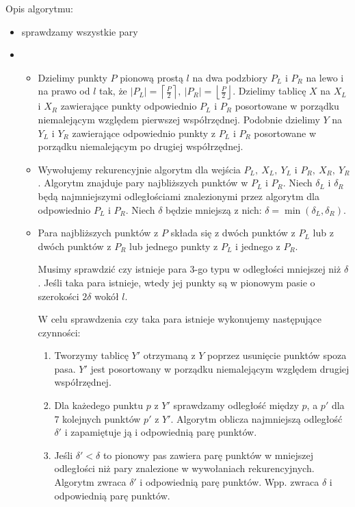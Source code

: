 Opis algorytmu: 
\begin{itemize}
	\item[jeśli $|P| \leq 3$] sprawdzamy wszystkie pary
	\item[jeśli $|P| > 3$] ~ 
	\begin{itemize}
		\item[\underline{Dziel:}] Dzielimy punkty $P$ pionową prostą $l$ na dwa podzbiory $P_L$ i $P_R$ na lewo i na prawo 
		od $l$ tak, że $|P_L| = \left\lceil \frac{P}{2} \right\rceil,\ |P_R| = \left\lfloor \frac{P}{2} \right\rfloor$. 
		Dzielimy tablicę $X$ na $X_L$ i $X_R$ zawierające punkty odpowiednio $P_L$ i $P_R$ posortowane w porządku 
		niemalejącym względem pierwszej współrzędnej. Podobnie dzielimy $Y$ na $Y_L$ i $Y_R$ zawierające 
		odpowiednio punkty z $P_L$ i $P_R$ posortowane w porządku niemalejącym po drugiej współrzędnej. 
		
		\item[\underline{Zwyciężaj:}] Wywołujemy rekurencyjnie algorytm dla wejścia $P_L,\ X_L,\ Y_L$ i $P_R,\ X_R,\ Y_R$. 
		Algorytm znajduje pary najbliższych punktów w $P_L$ i $P_R$. Niech $\delta_L$ i $\delta_R$ będą 
		najmniejszymi odległościami znalezionymi przez algorytm dla odpowiednio $P_L$ i $P_R$. 
		Niech $\delta$ będzie mniejszą z nich: $\delta = \min(\delta_L,\delta_R)$.
		
		\item[\underline{Połącz:}] Para najbliższych punktów z $P$ składa się z dwóch punktów z $P_L$ lub z dwóch punktów 
		z $P_R$ lub jednego punkty z $P_L$ i jednego z $P_R$. 
		
		Musimy sprawdzić czy istnieje para 3-go typu w odległości mniejszej niż $\delta$. 
		Jeśli taka para istnieje, wtedy jej punkty są w pionowym pasie o szerokości $2\delta$ 
		wokół $l$. 
		
		W celu sprawdzenia czy taka para istnieje wykonujemy następujące czynności:
		\begin{enumerate}
			\item Tworzymy tablicę $Y'$ otrzymaną z $Y$ poprzez usunięcie punktów spoza pasa. $Y'$ jest 
			posortowany w porządku niemalejącym względem drugiej współrzędnej. 
			\item Dla każedego punktu $p$ z $Y'$ sprawdzamy odległość między $p$, a $p'$ dla $7$ kolejnych 
			punktów $p'$ z $Y'$. Algorytm oblicza najmniejszą odległość $\delta'$ i zapamiętuje ją i odpowiednią 
			parę punktów. 
			\item Jeśli $\delta' < \delta$ to pionowy pas zawiera parę punktów w mniejszej odległości niż pary znalezione 
			w wywołaniach rekurencyjnych. Algorytm zwraca $\delta'$ i odpowiednią parę punktów. Wpp. zwraca $\delta$ 
			i odpowiednią parę punktów. 
		\end{enumerate}
	\end{itemize}
\end{itemize}

